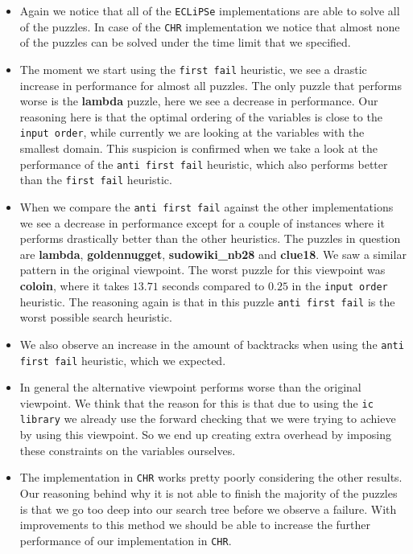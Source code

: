 \begin{itemize}
\item Again we notice that all of the \texttt{ECLiPSe} implementations are able to solve all of the puzzles. In case of the \texttt{CHR} implementation we notice that almost none of the puzzles can be solved under the time limit that we specified.
\item The moment we start using the \texttt{first fail} heuristic, we see a drastic increase in performance for almost all puzzles. The only puzzle that performs worse is the \textbf{lambda} puzzle, here we see a decrease in performance. Our reasoning here is that the optimal ordering of the variables is close to the \texttt{input order}, while currently we are looking at the variables with the smallest domain. This suspicion is confirmed when we take a look at the performance of the \texttt{anti first fail} heuristic, which also performs better than the \texttt{first fail} heuristic.
\item When we compare the \texttt{anti first fail} against the other implementations we see a decrease in performance except for a couple of instances where it performs drastically better than the other heuristics. The puzzles in question are \textbf{lambda}, \textbf{goldennugget}, \textbf{sudowiki\_nb28} and \textbf{clue18}. We saw a similar pattern in the original viewpoint. The worst puzzle for this viewpoint was \textbf{coloin}, where it takes $13.71$ seconds compared to $0.25$ in the \texttt{input order} heuristic. The reasoning again is that in this puzzle \texttt{anti first fail} is the worst possible search heuristic.
\item We also observe an increase in the amount of backtracks when using the \texttt{anti first fail} heuristic, which we expected.
\item In general the alternative viewpoint performs worse than the original viewpoint. We think that the reason for this is that due to using the \texttt{ic library} we already use the forward checking that we were trying to achieve by using this viewpoint. So we end up creating extra overhead by imposing these constraints on the variables ourselves. 
\item The implementation in \texttt{CHR} works pretty poorly considering the other results. Our reasoning behind why it is not able to finish the majority of the puzzles is that we go too deep into our search tree before we observe a failure. With improvements to this method we should be able to increase the further performance of our implementation in \texttt{CHR}.
\end{itemize}

